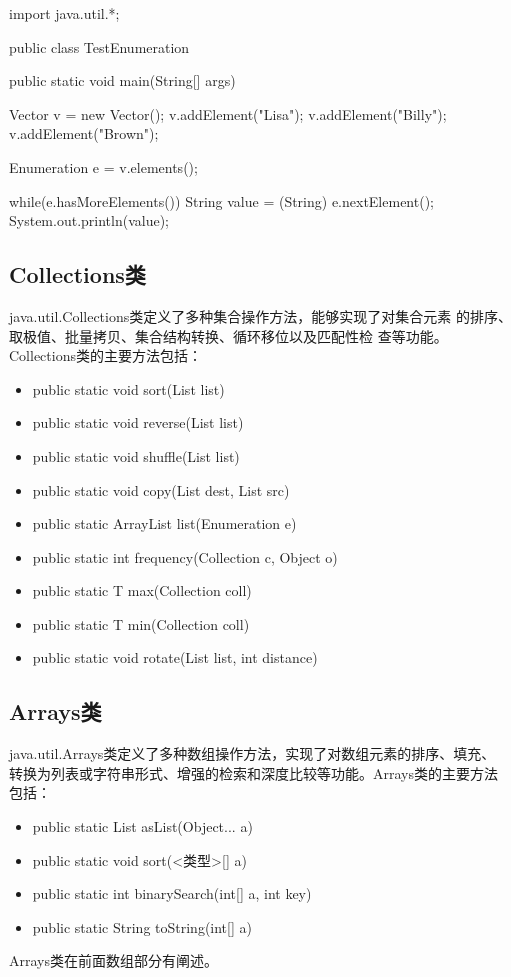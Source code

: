 \begin{javaCode}
  import java.util.*;

  public class TestEnumeration {
    public static void main(String[] args) {
      Vector v = new Vector();
      v.addElement("Lisa");
      v.addElement("Billy");
      v.addElement("Brown");

      Enumeration e = v.elements();

      while(e.hasMoreElements()) {
        String value = (String) e.nextElement();
        System.out.println(value);
      }
    }
  }
\end{javaCode}

\subsection{Collections类}

java.util.Collections类定义了多种集合操作方法，能够实现了对集合元素
的{\Blue\hei 排序、取极值、批量拷贝、集合结构转换、循环移位以及匹配性检
  查}等功能。Collections类的主要方法包括：

\begin{itemize}\small
\item public static void sort(List list)
\item public static void reverse(List list)
\item public static void shuffle(List list)
\item public static void copy(List dest, List src)
\item public static ArrayList list(Enumeration e)
\item public static int frequency(Collection c, Object o)
\item public static T max(Collection coll)
\item public static T min(Collection coll)
\item public static void rotate(List list, int distance)
\end{itemize}

\subsection{Arrays类}

java.util.Arrays类定义了多种数组操作方法，实现了对数组元素的排序、填充、
转换为列表或字符串形式、增强的检索和深度比较等功能。Arrays类的主要方法
包括：

\begin{itemize}
\item public static List asList(Object... a)
\item public static void sort(<类型>[] a)
\item public static int binarySearch(int[] a, int key)
\item public static String toString(int[] a)
\end{itemize}


Arrays类在前面数组部分有阐述。


